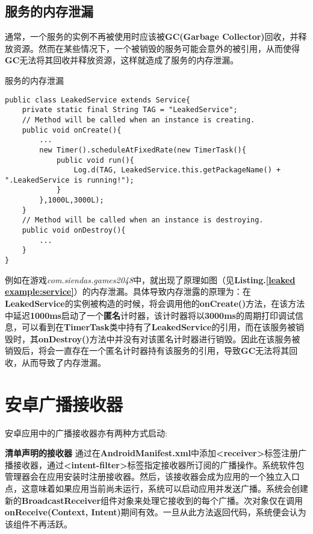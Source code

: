 \subsection{服务的内存泄漏}\label{service_leak}
通常，一个服务的实例不再被使用时应该被\textbf{GC(Garbage Collector)}回收，并释放资源。然而在某些情况下，一个被销毁的服务可能会意外的被引用，从而使得\textbf{GC}无法将其回收并释放资源，这样就造成了服务的内存泄漏。
\begin{listing}[htbp]
	\centering
	\caption{服务的内存泄漏}
	\begin{verbatim}
public class LeakedService extends Service{
	private static final String TAG = "LeakedService";
	// Method will be called when an instance is creating.
	public void onCreate(){
		...
		new Timer().scheduleAtFixedRate(new TimerTask(){
			public void run(){
				Log.d(TAG, LeakedService.this.getPackageName() + ".LeakedService is running!");
			}
		},1000L,3000L);
	}
	// Method will be called when an instance is destroying.
	public void onDestroy(){
		...
	}
}
	\end{verbatim}
	\label{leaked example:service}
\end{listing}

例如在游戏\emph{com.siendas.games2048}中，就出现了原理如图（见\textbf{Listing.\textcolor{red}{\ref{leaked example:service}}}）的内存泄漏。具体导致内存泄露的原理为：在\textbf{LeakedService}的实例被构造的时候，将会调用他的\textbf{onCreate()}方法，在该方法中延迟\textbf{1000ms}启动了一个\textbf{匿名}计时器，该计时器将以\textbf{3000ms}的周期打印调试信息，可以看到在\textbf{TimerTask}类中持有了\textbf{LeakedService}的引用，而在该服务被销毁时，其\textbf{onDestroy()}方法中并没有对该匿名计时器进行销毁。因此在该服务被销毁后，将会一直存在一个匿名计时器持有该服务的引用，导致\textbf{GC}无法将其回收，从而导致了内存泄漏。

\section{安卓广播接收器}
安卓应用中的广播接收器亦有两种方式启动\cite{broadcast}:

\textbf{清单声明的接收器 }\label{declaration:receiver in manifest} 通过在\textbf{AndroidManifest.xml}中添加\textbf{<receiver>}标签注册广播接收器，通过\textbf{<intent-filter>}标签指定接收器所订阅的广播操作。系统软件包管理器会在应用安装时注册接收器。然后，该接收器会成为应用的一个独立入口点，这意味着如果应用当前尚未运行，系统可以启动应用并发送广播。系统会创建新的\textbf{BroadcastReceiver}组件对象来处理它接收到的每个广播。次对象仅在调用\textbf{onReceive(Context, Intent)}期间有效。一旦从此方法返回代码，系统便会认为该组件不再活跃。

